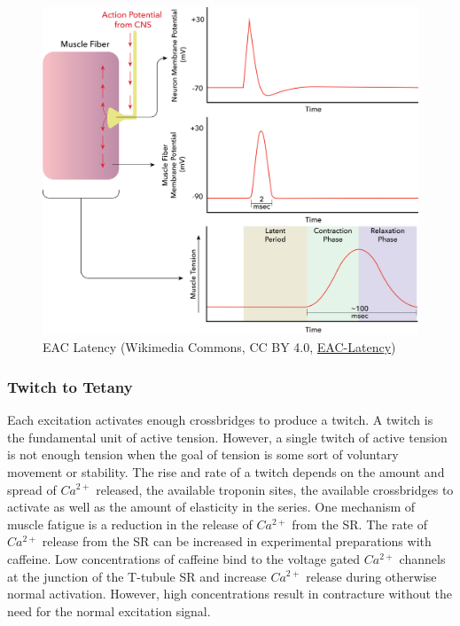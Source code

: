 \begin{figure}[!ht]
    \centering
    \includegraphics[width=1\linewidth]{./figure/eac-latency.png}
    \caption{EAC Latency \footnotesize{(Wikimedia Commons, CC BY 4.0, \href{https://commons.wikimedia.org/wiki/File:The_latent_period_between_the_muscle_action_potential_and_contraction.png}{EAC-Latency})}}
    \label{fig:eac-latency}
\end{figure}

\subsubsection{Twitch to Tetany}
Each excitation activates enough crossbridges to produce a twitch. A twitch is the fundamental unit of active tension. However, a single twitch of active tension is not enough tension when the goal of tension is some sort of voluntary movement or stability. The rise and rate of a twitch depends on the amount and spread of $Ca^{2+}$ released, the available troponin sites, the available crossbridges to activate as well as the amount of elasticity in the series. One mechanism of muscle fatigue is a reduction in the release of $Ca^{2+}$ from the SR. The rate of $Ca^{2+}$ release from the SR can be increased in experimental preparations with caffeine. Low concentrations of caffeine bind to the voltage gated $Ca^{2+}$ channels at the junction of the T-tubule SR and increase $Ca^{2+}$ release during otherwise normal activation. However, high concentrations result in contracture without the need for the normal excitation signal. 

